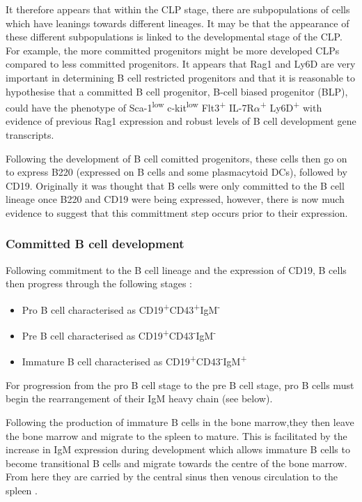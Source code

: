 It therefore appears that within the CLP stage, there are subpopulations of cells which have leanings towards different lineages.
It may be that the appearance of these different subpopulations is linked to the developmental stage of the CLP.
For example, the more committed progenitors might be more developed CLPs compared to less committed progenitors.
It appears that Rag1 and Ly6D are very important in determining B cell restricted progenitors and that it is reasonable to hypothesise that a committed B cell progenitor, B-cell biased progenitor (BLP), could have the phenotype of Sca-1\textsuperscript{low} c-kit\textsuperscript{low} Flt3\textsuperscript{+} IL-7R$\alpha$\textsuperscript{+} Ly6D\textsuperscript{+} with evidence of previous Rag1 expression and robust levels of B cell development gene transcripts.

Following the development of B cell comitted progenitors, these cells then go on to express B220 (expressed on B cells and some plasmacytoid DCs), followed by CD19.
Originally it was thought that B cells were only committed to the B cell lineage once B220 and CD19 were being expressed, however, there is now much evidence to suggest that this committment step occurs prior to their expression.


\subsubsection{Committed B cell development}
\label{subsubsec:committedBcelldevelopment}

Following commitment to the B cell lineage and the expression of CD19, B cells then progress through the following stages \citep{Cambier2007}:
\begin{itemize}
\item Pro B cell characterised as CD19\textsuperscript{+}CD43\textsuperscript{+}IgM\textsuperscript{-}
\item Pre B cell characterised as CD19\textsuperscript{+}CD43\textsuperscript{-}IgM\textsuperscript{-}
\item Immature B cell characterised as CD19\textsuperscript{+}CD43\textsuperscript{-}IgM\textsuperscript{+}
\end{itemize}

For progression from the pro B cell stage to the pre B cell stage, pro B cells must begin the rearrangement of their IgM heavy chain (see below).

Following the production of immature B cells in the bone marrow,they then leave the bone marrow and migrate to the spleen to mature.
This is facilitated by the increase in IgM expression during development which allows immature B cells to become transitional B cells and migrate towards the centre of the bone marrow. 
From here they are carried by the central sinus then venous circulation to the spleen \citep{Loder1999}.


